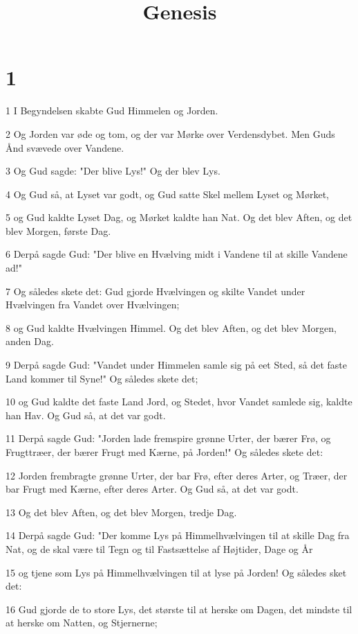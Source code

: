 

\title{Genesis}



\chapter{1}

\par 1 I Begyndelsen skabte Gud Himmelen og Jorden.
\par 2 Og Jorden var øde og tom, og der var Mørke over Verdensdybet. Men Guds Ånd svævede over Vandene.
\par 3 Og Gud sagde: "Der blive Lys!" Og der blev Lys.
\par 4 Og Gud så, at Lyset var godt, og Gud satte Skel mellem Lyset og Mørket,
\par 5 og Gud kaldte Lyset Dag, og Mørket kaldte han Nat. Og det blev Aften, og det blev Morgen, første Dag.
\par 6 Derpå sagde Gud: "Der blive en Hvælving midt i Vandene til at skille Vandene ad!"
\par 7 Og således skete det: Gud gjorde Hvælvingen og skilte Vandet under Hvælvingen fra Vandet over Hvælvingen;
\par 8 og Gud kaldte Hvælvingen Himmel. Og det blev Aften, og det blev Morgen, anden Dag.
\par 9 Derpå sagde Gud: "Vandet under Himmelen samle sig på eet Sted, så det faste Land kommer til Syne!" Og således skete det;
\par 10 og Gud kaldte det faste Land Jord, og Stedet, hvor Vandet samlede sig, kaldte han Hav. Og Gud så, at det var godt.
\par 11 Derpå sagde Gud: "Jorden lade fremspire grønne Urter, der bærer Frø, og Frugttræer, der bærer Frugt med Kærne, på Jorden!" Og således skete det:
\par 12 Jorden frembragte grønne Urter, der bar Frø, efter deres Arter, og Træer, der bar Frugt med Kærne, efter deres Arter. Og Gud så, at det var godt.
\par 13 Og det blev Aften, og det blev Morgen, tredje Dag.
\par 14 Derpå sagde Gud: "Der komme Lys på Himmelhvælvingen til at skille Dag fra Nat, og de skal være til Tegn og til Fastsættelse af Højtider, Dage og År
\par 15 og tjene som Lys på Himmelhvælvingen til at lyse på Jorden! Og således sket det:
\par 16 Gud gjorde de to store Lys, det største til at herske om Dagen, det mindste til at herske om Natten, og Stjernerne;

